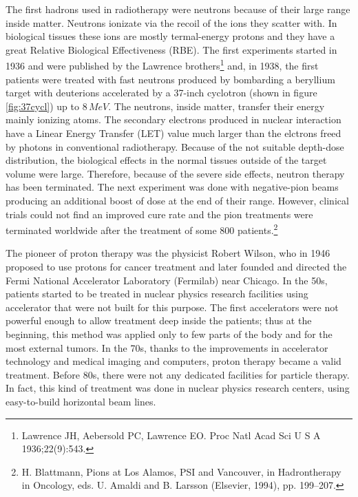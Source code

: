 \documentclass[12pt, a4paper, twoside]{book}
\begin{document}
The first hadrons used in radiotherapy were neutrons because of their large range inside matter. Neutrons ionizate via the recoil of the ions they scatter with. In biological tissues these ions are mostly termal-energy protons and they have a great Relative Biological Effectiveness (RBE). 
The first experiments started in 1936 and were published by the Lawrence brothers\footnote{Lawrence JH, Aebersold PC, Lawrence EO. Proc Natl Acad Sci U S A 1936;22(9):543.} and, in 1938, the first patients were treated with fast neutrons produced by bombarding a beryllium target with deuterions accelerated by a 37-inch cyclotron (shown in figure \ref{fig:37cycl}) up to $8\,MeV$. The neutrons, inside matter, transfer their energy mainly ionizing atoms. The secondary electrons produced in nuclear interaction have a Linear Energy Transfer (LET) value much larger than the elctrons freed by photons in conventional radiotherapy.
Because of the not suitable depth-dose distribution, the biological effects in the normal tissues outside of the target volume were large. Therefore, because of the severe side effects, neutron therapy has been terminated.
The next experiment was done with negative-pion beams producing an additional boost of dose at the end of their range. However, clinical trials could not find an improved cure rate and the pion treatments were terminated worldwide after the treatment of some 800 patients.\footnote{H. Blattmann, Pions at Los Alamos, PSI and Vancouver, in Hadrontherapy in Oncology, eds. U. Amaldi and B. Larsson (Elsevier, 1994), pp. 199–207.}

The pioneer of proton therapy was the physicist Robert Wilson, who in 1946 proposed to use protons for cancer treatment and later founded and directed the Fermi National Accelerator Laboratory (Fermilab) near Chicago.
In the 50s, patients started to be treated in nuclear physics research facilities using accelerator that were not built for this purpose.
The first accelerators were not powerful enough to allow treatment deep inside the patients; thus at the beginning, this method was applied only to few parts of the body and for the most external tumors.
In the 70s, thanks to the improvements in accelerator technology and medical imaging and computers, proton therapy became a valid treatment.
Before 80s, there were not any dedicated facilities for particle therapy. In fact, this kind of treatment was done in nuclear physics research centers, using easy-to-build horizontal beam lines.
\end{document}

